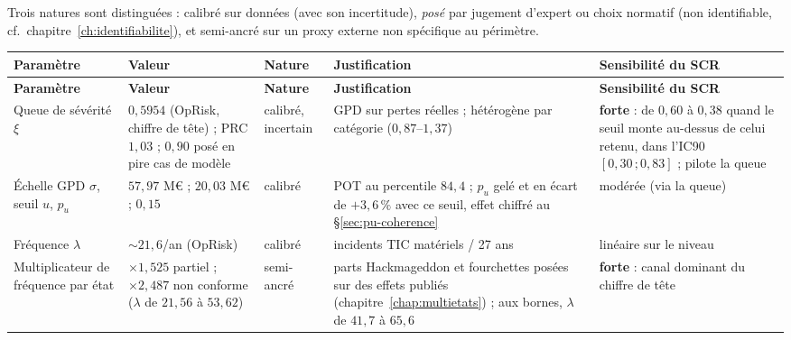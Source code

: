 Trois natures sont distinguées : calibré sur données (avec son incertitude),
\emph{posé} par jugement d'expert ou choix normatif (non identifiable, cf.\
chapitre~\ref{ch:identifiabilite}), et semi-ancré sur un proxy externe non
spécifique au périmètre.

\vspace{0.25cm}
{\footnotesize
\renewcommand{\arraystretch}{1.28}
\begin{longtable}{@{}>{\raggedright\arraybackslash}p{2.7cm}
                    >{\raggedright\arraybackslash}p{2.6cm}
                    >{\raggedright\arraybackslash}p{1.7cm}
                    >{\raggedright\arraybackslash}p{4.0cm}
                    >{\raggedright\arraybackslash}p{3.6cm}@{}}
\toprule
\textbf{Paramètre} & \textbf{Valeur} & \textbf{Nature} & \textbf{Justification} & \textbf{Sensibilité du SCR} \\
\midrule
\endfirsthead
\toprule
\textbf{Paramètre} & \textbf{Valeur} & \textbf{Nature} & \textbf{Justification} & \textbf{Sensibilité du SCR} \\
\midrule
\endhead
\bottomrule
\endlastfoot
Queue de sévérité $\xi$ & $0{,}5954$ (OpRisk, chiffre de tête) ; PRC $1{,}03$ ; $0{,}90$ posé en pire cas de modèle & calibré, incertain & GPD sur pertes réelles ; hétérogène par catégorie ($0{,}87$--$1{,}37$) & \textbf{forte} : de $0{,}60$ à $0{,}38$ quand le seuil monte au-dessus de celui retenu, dans l'IC90 $[0{,}30\,;0{,}83]$ ; pilote la queue \\
Échelle GPD $\sigma$, seuil $u$, $p_u$ & $57{,}97$ M\euro{} ; $20{,}03$ M\euro{} ; $0{,}15$ & calibré & POT au percentile $84{,}4$ ; $p_u$ gelé et en écart de $+3{,}6\,\%$ avec ce seuil, effet chiffré au \S\ref{sec:pu-coherence} & modérée (via la queue) \\
Fréquence $\lambda$ & ${\sim}21{,}6$/an (OpRisk) & calibré & incidents TIC matériels / 27 ans & linéaire sur le niveau \\
Multiplicateur de fréquence par état & $\times 1{,}525$ partiel ; $\times 2{,}487$ non conforme ($\lambda$ de $21{,}56$ à $53{,}62$) & semi-ancré & parts Hackmageddon et fourchettes posées sur des effets publiés (chapitre~\ref{chap:multietats}) ; aux bornes, $\lambda$ de $41{,}7$ à $65{,}6$ & \textbf{forte} : canal dominant du chiffre de tête \\

\end{longtable}}
